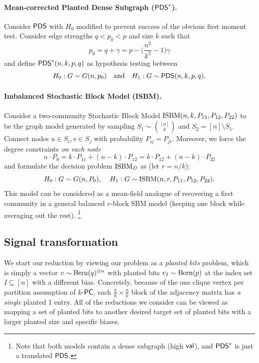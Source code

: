 \documentclass[final,12pt]{colt2023} %
\newcommand\1[1]{\mathbb{I}_{\left\{#1\right\}}}
\begin{document}
\paragraph{Mean-corrected Planted Dense Subgraph ($\mathsf{PDS}^*$).}
Consider $\mathsf{PDS}$ with $H_0$ modified to prevent success of the obvious first moment test. Consider edge strengths $q<p_0<p$ and size $k$ such that
$$p_0=q+\gamma=p-\Big(\frac{n^2}{k^2}-1\Big)\gamma$$ 
and define $\mathsf{PDS}^*(n,k,p,q)$ as hypothesis testing between
\begin{equation}\label{PDSSTAR}
    H_0: G\sim G(n, p_0)
   \quad \text{and}\quad
    H_1: G\sim \mathsf{PDS}(n, k, p, q).
\end{equation}


\paragraph{Imbalanced Stochastic Block Model (ISBM).}
Consider a two-community Stochastic Block Model $\textup{ISBM}(n, k, P_{11}, P_{12}, P_{22})$ to be the graph model generated by sampling $S_1\sim {[n]\choose k}$ and $S_2=[n]\setminus S_1$. Connect nodes $u\in S_i, v\in S_j$ with probability $P_{ij}=P_{ji}$. Moreover, we force the degree constraints \textit{on each node}
$$n\cdot P_0=k\cdot P_{11}+(n-k)\cdot P_{12}=k\cdot P_{12}+(n-k)\cdot P_{22}$$ and formulate the decision problem $\textup{ISBM}_D$ as (let $r=n/k$):
\begin{equation}\label{ISBM}
    H_0: G\sim G(n, P_0),\;\;\;\;H_1: G\sim \textup{ISBM}(n, r, P_{11}, P_{12}, P_{22}).
\end{equation}
This model can be considered as a mean-field analogue of recovering a first community
in a general balanced $r$-block SBM model (keeping one block while averaging out the rest).
\footnote{
Note that both models contain a dense subgraph (high $\mathsf{val}$), and $\mathsf{PDS}^*$ is just a translated $\mathsf{PDS}$.}

\subsection{Signal transformation}
We start our reduction by viewing our problem as a \emph{planted bits} problem, which is simply a vector $v\sim{\rm Bern}(q)^{\otimes n}$ with planted bits $v_I\sim{\rm Bern}(p)$ at the index set $I\subseteq [n]$ with a different bias. 
Concretely, because of the one clique vertex per partition assumption of $k$-$\mathsf{PC}$, each $\frac nk \times \frac nk$ block of the adjacency matrix has \emph{a single} planted 1 entry.
All of the reductions we consider can be viewed as mapping a set of planted bits to another desired target set of planted bits with a larger planted size and specific biases.
\end{document}
